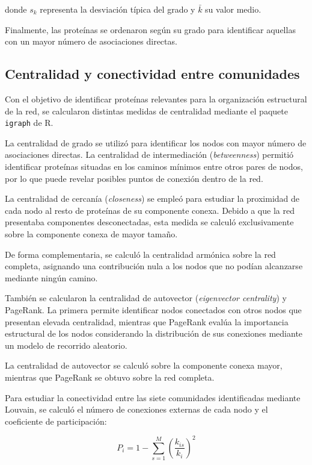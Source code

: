 donde $s_k$ representa la desviación típica
del grado y $\bar{k}$ su valor medio.

Finalmente, las proteínas se ordenaron según
su grado para identificar aquellas con un
mayor número de asociaciones directas.


\subsection{Centralidad y conectividad entre comunidades}

Con el objetivo de identificar proteínas relevantes
para la organización estructural de la red, se
calcularon distintas medidas de centralidad mediante
el paquete \texttt{igraph} de R.

La centralidad de grado se utilizó para identificar
los nodos con mayor número de asociaciones directas.
La centralidad de intermediación (\textit{betweenness})
permitió identificar proteínas situadas en los caminos
mínimos entre otros pares de nodos, por lo que puede
revelar posibles puntos de conexión dentro de la red.

La centralidad de cercanía (\textit{closeness}) se
empleó para estudiar la proximidad de cada nodo al
resto de proteínas de su componente conexa. Debido
a que la red presentaba componentes desconectadas,
esta medida se calculó exclusivamente sobre la
componente conexa de mayor tamaño.

De forma complementaria, se calculó la centralidad
armónica sobre la red completa, asignando una
contribución nula a los nodos que no podían
alcanzarse mediante ningún camino.

También se calcularon la centralidad de autovector
(\textit{eigenvector centrality}) y PageRank.
La primera permite identificar nodos conectados
con otros nodos que presentan elevada centralidad,
mientras que PageRank evalúa la importancia
estructural de los nodos considerando la distribución
de sus conexiones mediante un modelo de recorrido
aleatorio.

La centralidad de autovector se calculó sobre
la componente conexa mayor, mientras que
PageRank se obtuvo sobre la red completa.

Para estudiar la conectividad entre las siete
comunidades identificadas mediante Louvain, se
calculó el número de conexiones externas de
cada nodo y el coeficiente de participación:

\begin{equation}
P_i = 1 - \sum_{s=1}^{M}
\left(\frac{k_{is}}{k_i}\right)^2
\end{equation}

